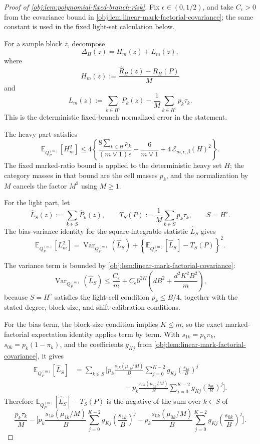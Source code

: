 \begin{proof}[Proof of \cref{obj:lem:polynomial-fixed-branch-risk}]
Fix \(\epsilon\in(0,1/2)\), and take \(C_\epsilon>0\) from the covariance bound in \cref{obj:lem:linear-mark-factorial-covariance}; the same constant is used in the fixed light-set calculation below. %

For a sample block \(z\), decompose
\[
\Delta_H(z)=H_m(z)+L_m(z),
\]
where
\[
H_m(z):=\frac{\widehat R_H(z)-R_H(P)}{M}
\]
and
\[
L_m(z):=
\sum_{k\in H^{\mathrm c}}\widehat P_k(z)
-\frac1M\sum_{k\in H^{\mathrm c}}p_k\tau_k .
\]
This is the deterministic fixed-branch normalized error in the statement. %

The heavy part satisfies
\[
\mathbb E_{Q_P^{(m)}}[H_m^2]
\le
4\left\{
\frac{8\sum_{k\in H}p_k}{(m\vee1)\epsilon}
+\frac{6}{m\vee1}
+4\,\mathcal E_{m,\epsilon,\beta}(H)^2
\right\}.
\]
The fixed marked-ratio bound is applied to the deterministic heavy set \(H\); the category masses in that bound are the cell masses \(p_k\), and the normalization by \(M\) cancels the factor \(M^2\) using \(M\ge1\). %

For the light part, let
\[
\widehat L_S(z):=\sum_{k\in S}\widehat P_k(z),
\qquad
T_S(P):=\frac1M\sum_{k\in S}p_k\tau_k,
\qquad S=H^{\mathrm c}.
\]
The bias-variance identity for the square-integrable statistic \(\widehat L_S\) gives
\[
\mathbb E_{Q_P^{(m)}}[L_m^2]
=
\operatorname{Var}_{Q_P^{(m)}}(\widehat L_S)
+
\left\{
\mathbb E_{Q_P^{(m)}}[\widehat L_S]-T_S(P)
\right\}^2 .
\]

The variance term is bounded by \cref{obj:lem:linear-mark-factorial-covariance}:
\[
\operatorname{Var}_{Q_P^{(m)}}(\widehat L_S)
\le
\frac{C_\epsilon}{m}
+
C_\epsilon6^{2K}
\left(dB^2+\frac{d^2K^2B^2}{m}\right),
\]
because \(S=H^{\mathrm c}\) satisfies the light-cell condition \(p_k\le B/4\), together with the stated degree, block-size, and shift-calibration conditions. %

For the bias term, the block-size condition implies \(K\le m\), so the exact marked-factorial expectation identity applies term by term. With \(s_{1k}=p_k\pi_k\), \(s_{0k}=p_k(1-\pi_k)\), and the coefficients \(g_{Kj}\) from \cref{obj:lem:linear-mark-factorial-covariance}, it gives
\[
\begin{aligned}
\mathbb E_{Q_P^{(m)}}[\widehat L_S]
&=
\sum_{k\in S}
\Bigg[
 p_k\frac{s_{1k}(\mu_{1k}/M)}{B}
 \sum_{j=0}^{K-2}g_{Kj}\left(\frac{s_{1k}}{B}\right)^j \\
&\hspace{7em}{}-
 p_k\frac{s_{0k}(\mu_{0k}/M)}{B}
 \sum_{j=0}^{K-2}g_{Kj}\left(\frac{s_{0k}}{B}\right)^j
\Bigg].
\end{aligned}
\]
Therefore \(\mathbb E_{Q_P^{(m)}}[\widehat L_S]-T_S(P)\) is the negative of the sum over \(k\in S\) of
\[
\frac{p_k\tau_k}{M}
-
\Bigg[
 p_k\frac{s_{1k}(\mu_{1k}/M)}{B}
 \sum_{j=0}^{K-2}g_{Kj}\left(\frac{s_{1k}}{B}\right)^j
-
 p_k\frac{s_{0k}(\mu_{0k}/M)}{B}
 \sum_{j=0}^{K-2}g_{Kj}\left(\frac{s_{0k}}{B}\right)^j
\Bigg].
\]


\end{proof}
